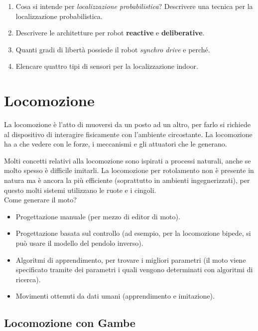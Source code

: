 \documentclass[a4paper,portrait,12pt]{article}
\theoremstyle{definition}
\begin{document}
\begin{enumerate}
\item Cosa si intende per \emph{localizzazione probabilistica}? Descrivere una tecnica per la localizzazione probabilistica.

\item Descrivere le architetture per robot \textbf{reactive} e \textbf{deliberative}.

\item Quanti gradi di libertà possiede il robot \emph{synchro drive} e perché.

\item Elencare quattro tipi di sensori per la localizzazione indoor.

\end{enumerate}



\section{Locomozione}

La locomozione è l'atto di muoversi da un posto ad un altro, per farlo si richiede al dispositivo di interagire fisicamente con l'ambiente circostante.
La locomozione ha a che vedere con le forze, i meccanismi e gli attuatori che le generano.

Molti concetti relativi alla locomozione sono ispirati a processi naturali, anche se molto spesso è difficile imitarli.
La locomozione per rotolamento non è presente in natura ma è ancora la più efficiente (soprattutto in ambienti ingegnerizzati), per questo molti sistemi utilizzano le ruote e i cingoli.\\

Come generare il moto?
\begin{itemize}
\item Progettazione manuale (per mezzo di editor di moto).
\item Progettazione basata sul controllo (ad esempio, per la locomozione bipede, si può usare il modello del pendolo inverso).
\item Algoritmi di apprendimento, per trovare i migliori parametri (il moto viene specificato tramite dei parametri i quali vengono determinati con algoritmi di ricerca).
\item Movimenti ottenuti da dati umani (apprendimento e imitazione).
\end{itemize}

\subsection{Locomozione con Gambe}
\end{document}
